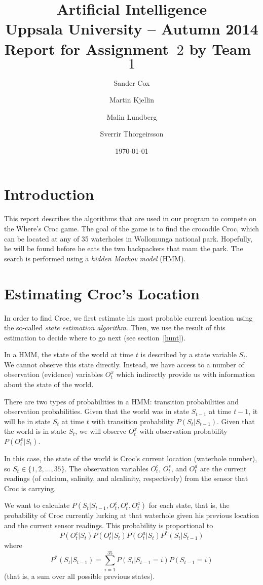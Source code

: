 \documentclass[a4paper]{article}
\title{\textbf{Artificial Intelligence \\
    Uppsala University -- Autumn 2014 \\
    Report for Assignment~$2$
    by Team~$1$
  }
}
\author{Sander Cox \and Martin Kjellin \and Malin Lundberg \and Sverrir
  Thorgeirsson}
\date{\today}
\begin{document}
\maketitle

\section{Introduction}

This report describes the algorithms that are used in our program to compete
on the Where's Croc game. The goal of the game is to find the crocodile Croc,
which can be located at any of 35 waterholes in Wollomunga national
park. Hopefully, he will be found before he eats the two backpackers that roam
the park. The search is performed using a \emph{hidden Markov model} (HMM).

\section{Estimating Croc's Location}

In order to find Croc, we first estimate his most probable current
location using the so-called \emph{state estimation algorithm}. Then, we use
the result of this estimation to decide where to go next (see section~\ref{hunt}).

In a HMM, the state of the world at time $t$ is
described by a state variable $S_t$. We cannot observe this state
directly. Instead, we have access to a number of observation (evidence)
variables $O^x_t$ which indirectly provide us with information about the state
of the world.

There are two types of probabilities in a HMM: transition probabilities and
observation probabilities. %
Given that the world was in state $S_{t-1}$ at time $t-1$, it
will be in state $S_t$ at time $t$ with transition probability
$P(S_t|S_{t-1})$. Given that the world is in state $S_t$, we will observe
$O^x_t$ with observation probability $P(O^x_t|S_t)$.

In this case, the state of the world is Croc's current location (waterhole
number), so $S_t \in \{1, 2, \dots, 35\}$. %
The observation variables $O^c_t$, $O^s_t$, and $O^a_t$ are the current
readings (of calcium, salinity, and alcalinity, respectively) from the sensor
that Croc is carrying.

We want to calculate $P(S_t|S_{t-1}, O^c_t, O^s_t, O^a_t)$ for each state,
that is, the probability of Croc currently lurking at that waterhole
given his previous location and the current sensor readings. This probability
is proportional to
\begin{equation*}
P(O^c_t|S_t)P(O^s_t|S_t)P(O^a_t|S_t)P^*(S_t|S_{t-1})
\end{equation*}
where
\begin{equation*}
P^*(S_t|S_{t-1}) = \sum\limits_{i=1}^{35} P(S_t|S_{t-1}=i)P(S_{t-1}=i)  
\end{equation*}
(that is, a sum over all possible previous states).
\end{document}
